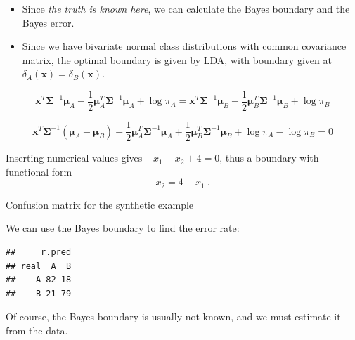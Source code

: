 \documentclass[
  10pt,
  ignorenonframetext,
]{beamer}
\newenvironment{Shaded}{\begin{snugshade}}{\end{snugshade}}
\newcommand{\AttributeTok}[1]{\textcolor[rgb]{0.13,0.29,0.53}{#1}}
\newcommand{\DecValTok}[1]{\textcolor[rgb]{0.00,0.00,0.81}{#1}}
\newcommand{\FunctionTok}[1]{\textcolor[rgb]{0.13,0.29,0.53}{\textbf{#1}}}
\newcommand{\NormalTok}[1]{#1}
\newcommand{\OtherTok}[1]{\textcolor[rgb]{0.56,0.35,0.01}{#1}}
\newcommand{\SpecialCharTok}[1]{\textcolor[rgb]{0.81,0.36,0.00}{\textbf{#1}}}
\newcommand{\StringTok}[1]{\textcolor[rgb]{0.31,0.60,0.02}{#1}}
\begin{document}
\begin{frame}
\begin{itemize}
\item
  Since \emph{the truth is known here}, we can calculate the Bayes
  boundary and the Bayes error.
\item
  Since we have bivariate normal class distributions with common
  covariance matrix, the optimal boundary is given by LDA, with boundary
  given at \(\delta_A({\boldsymbol x})=\delta_B({\boldsymbol x})\).
\end{itemize}

\[{\boldsymbol x}^T \boldsymbol{\Sigma}^{-1}\boldsymbol\mu_A - \frac{1}{2}\boldsymbol\mu_A^T \boldsymbol{\Sigma}^{-1}\boldsymbol\mu_A + \log \pi_A={\boldsymbol x}^T \boldsymbol{\Sigma}^{-1}\boldsymbol\mu_B - \frac{1}{2}\boldsymbol\mu_B^T \boldsymbol{\Sigma}^{-1}\boldsymbol\mu_B + \log \pi_B\]

\[{\boldsymbol x}^T\boldsymbol{\Sigma}^{-1}(\boldsymbol\mu_A -\boldsymbol\mu_B)-\frac{1}{2}\boldsymbol\mu_A^T \boldsymbol{\Sigma}^{-1}\boldsymbol\mu_A +\frac{1}{2}\boldsymbol\mu_B^T \boldsymbol{\Sigma}^{-1}\boldsymbol\mu_B +\log \pi_A-\log \pi_B=0\]

Inserting numerical values gives \(-x_1-x_2+4=0\), thus a boundary with
functional form \[x_2=4-x_1 \ .\]
\end{frame}

\begin{frame}[fragile]
\begin{block}{Confusion matrix for the synthetic example}
\protect\hypertarget{confusion-matrix-for-the-synthetic-example}{}
\vspace{2mm}

We can use the Bayes boundary to find the error rate:

\vspace{2mm}

\scriptsize

\begin{Shaded}
\end{Shaded}

\begin{verbatim}
##     r.pred
## real  A  B
##    A 82 18
##    B 21 79
\end{verbatim}

\vspace{6mm}

\normalsize

Of course, the Bayes boundary is usually not known, and we must estimate
it from the data.
\end{block}
\end{frame}
\end{document}
